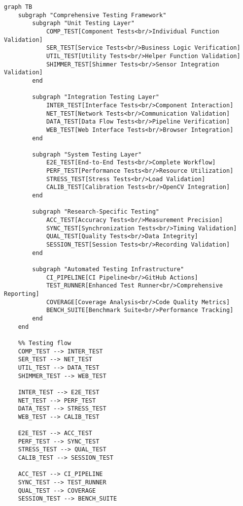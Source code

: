 \documentclass[12pt,a4paper]{article}
\begin{document}
\begin{verbatim}
graph TB
    subgraph "Comprehensive Testing Framework"
        subgraph "Unit Testing Layer"
            COMP_TEST[Component Tests<br/>Individual Function Validation]
            SER_TEST[Service Tests<br/>Business Logic Verification]
            UTIL_TEST[Utility Tests<br/>Helper Function Validation]
            SHIMMER_TEST[Shimmer Tests<br/>Sensor Integration Validation]
        end
        
        subgraph "Integration Testing Layer"
            INTER_TEST[Interface Tests<br/>Component Interaction]
            NET_TEST[Network Tests<br/>Communication Validation]
            DATA_TEST[Data Flow Tests<br/>Pipeline Verification]
            WEB_TEST[Web Interface Tests<br/>Browser Integration]
        end
        
        subgraph "System Testing Layer"
            E2E_TEST[End-to-End Tests<br/>Complete Workflow]
            PERF_TEST[Performance Tests<br/>Resource Utilization]
            STRESS_TEST[Stress Tests<br/>Load Validation]
            CALIB_TEST[Calibration Tests<br/>OpenCV Integration]
        end
        
        subgraph "Research-Specific Testing"
            ACC_TEST[Accuracy Tests<br/>Measurement Precision]
            SYNC_TEST[Synchronization Tests<br/>Timing Validation]
            QUAL_TEST[Quality Tests<br/>Data Integrity]
            SESSION_TEST[Session Tests<br/>Recording Validation]
        end
        
        subgraph "Automated Testing Infrastructure"
            CI_PIPELINE[CI Pipeline<br/>GitHub Actions]
            TEST_RUNNER[Enhanced Test Runner<br/>Comprehensive Reporting]
            COVERAGE[Coverage Analysis<br/>Code Quality Metrics]
            BENCH_SUITE[Benchmark Suite<br/>Performance Tracking]
        end
    end
    
    %% Testing flow
    COMP_TEST --> INTER_TEST
    SER_TEST --> NET_TEST
    UTIL_TEST --> DATA_TEST
    SHIMMER_TEST --> WEB_TEST
    
    INTER_TEST --> E2E_TEST
    NET_TEST --> PERF_TEST
    DATA_TEST --> STRESS_TEST
    WEB_TEST --> CALIB_TEST
    
    E2E_TEST --> ACC_TEST
    PERF_TEST --> SYNC_TEST
    STRESS_TEST --> QUAL_TEST
    CALIB_TEST --> SESSION_TEST
    
    ACC_TEST --> CI_PIPELINE
    SYNC_TEST --> TEST_RUNNER
    QUAL_TEST --> COVERAGE
    SESSION_TEST --> BENCH_SUITE
    

\end{verbatim}
\end{document}
